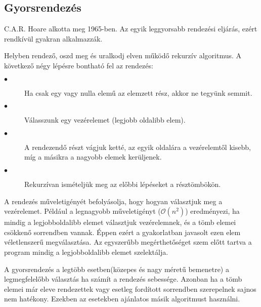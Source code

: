 \documentclass{elteikthesis}
\begin{document}
\subsection{Gyorsrendezés}
C.A.R. Hoare\cite{Horae} alkotta meg 1965-ben. Az egyik leggyorsabb rendezési eljárás, ezért rendkívül gyakran alkalmazzák.\par
Helyben rendező, oszd meg és uralkodj\cite{Cormen} elven működő rekurzív algoritmus. A következő négy lépésre bontható fel az rendezés:
\begin{description}
	\item[$\bullet$] Ha csak egy vagy nulla elemű az elemzett rész, akkor ne tegyünk semmit.
	\item[$\bullet$] Válasszunk egy vezérelemet (legjobb oldalibb elem).
	\item[$\bullet$] A rendezendő részt vágjuk ketté, az egyik oldalára a vezérelemtől kisebb, míg a másikra a nagyobb elemek kerüljenek.
	\item[$\bullet$] Rekurzívan ismételjük meg az előbbi lépéseket a résztömbökön.
\end{description}
A rendezés műveletigényét befolyásolja, hogy hogyan választjuk meg a vezérelemet. Például a legnagyobb műveletigényt ($\mathcal{O}(n^2)$) eredményezi, ha mindig a legjobboldalibb elemet választjuk vezérelemnek, és a tömb elemei csökkenő sorrendben vannak\cite{Cormen}. Éppen ezért a gyakorlatban javasolt ezen elem véletlenszerű megválasztása. Az egyszerűbb megérthetőséget szem előtt tartva a program mindig a legjobboldalibb elemet szelektálja.\par
 A gyorsrendezés a legtöbb esetben(közepes és nagy méretű bemenetre) a legmegfelelőbb választás ha számít a rendezés sebessége. Azonban ha a tömb elemei már eleve rendezettek vagy esetleg fordított sorrendben szerepelnek sajnos nem hatékony\cite{Cormen}. Ezekben az esetekben ajánlatos másik algoritmust használni.
\end{document}
